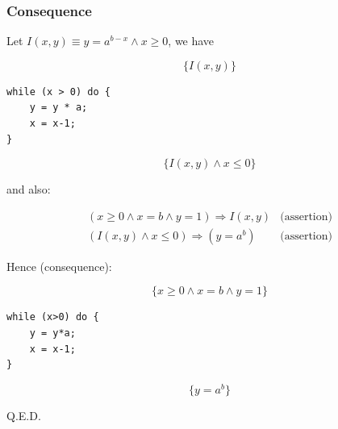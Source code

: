 \documentclass[12pt, a4paper]{book}
\begin{document}
    \subsubsection{Consequence}

    Let $I(x,y) \equiv y = {a}^{b-x} \land x \ge 0$, we have
    \bigskip

    \begin{minipage}{\linewidth}
        \begin{minipage}{0.3\linewidth}
            $$\{ I(x,y) \}$$
        \end{minipage}
        \begin{minipage}[c]{0.3\linewidth}
            \centering
\begin{lstlisting}
while (x > 0) do {
    y = y * a;
    x = x-1;
}
\end{lstlisting}
        \end{minipage}
        \begin{minipage}[c]{0.3\linewidth}
            $$\{ I(x,y) \land x \le 0 \}$$
        \end{minipage}
    \end{minipage}

    and also:

    \begin{eqnarray*}
        (x \ge 0 \land x = b \land y = 1) \Rightarrow I(x,y) & \textrm{(assertion)} \\
        (I(x,y) \land x \le 0) \Rightarrow (y = {a}^{b}) & \textrm{(assertion)}
    \end{eqnarray*}

    Hence (consequence):

    \begin{minipage}[c]{\linewidth}
        \begin{minipage}[c]{0.3\linewidth}
            $$\{ x \ge 0 \land x = b \land y = 1 \}$$
        \end{minipage}
        \begin{minipage}[c]{0.3\linewidth}
            \centering
\begin{lstlisting}
while (x>0) do {
    y = y*a;
    x = x-1;
}
\end{lstlisting}
        \end{minipage}
        \begin{minipage}[c]{0.3\linewidth}
            $$\{ y = {a}^{b} \}$$
        \end{minipage}
    \end{minipage}

    Q.E.D.
\end{document}
